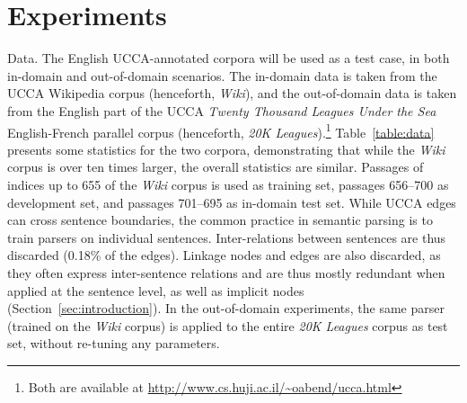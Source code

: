 \documentclass[11pt]{article}
\makeatletter
\newcommand{\secref}[1]{Section~\ref{#1}}
\newcommand{\tabref}[1]{Table~\ref{#1}}
\renewcommand{\paragraph}{
  \@startsection{paragraph}{4}
  {\z@}{.3ex \@plus .3ex \@minus .2ex}{-1em}
  {\normalfont\normalsize\bfseries}
}
\makeatother
\begin{document}
%



\section{Experiments}\label{sec:experiments}

\paragraph{Data.}\label{sec:data}
The English UCCA-annotated corpora \cite{abend2013universal} will be used
as a test case, in both in-domain and out-of-domain scenarios.
The in-domain data is taken from the UCCA Wikipedia corpus (henceforth, \textit{Wiki}),
and the out-of-domain data is taken from the English part of the UCCA
\textit{Twenty Thousand Leagues Under the Sea} English-French parallel corpus
(henceforth, \textit{20K Leagues}).\footnote{Both are available at
\url{http://www.cs.huji.ac.il/~oabend/ucca.html}}
\tabref{table:data} presents some statistics for the two corpora, demonstrating that while
the \textit{Wiki} corpus is over ten times larger, the overall statistics are
similar.
Passages of indices up to 655 of the \textit{Wiki} corpus is used as training
set, passages 656--700 as development set, and passages 701--695 as in-domain test set.
While UCCA edges can cross sentence boundaries, the common
practice in semantic parsing is to train parsers on individual sentences.
Inter-relations between sentences are thus discarded (0.18\% of the edges).
Linkage nodes and edges are also discarded, as they often express
inter-sentence relations and are thus mostly redundant when applied at the
sentence level, as well as implicit nodes (\secref{sec:introduction}).
In the out-of-domain experiments, the same parser
(trained on the \textit{Wiki} corpus) is applied to the entire \textit{20K
Leagues} corpus as test set, without re-tuning any parameters.
\end{document}
